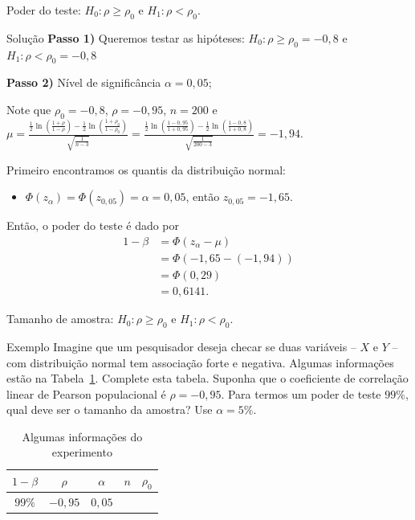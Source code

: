 \documentclass[9pt]{beamer}
\begin{document}
\begin{frame}{Poder do teste: $H_0:\rho \geq \rho_0$ e $H_1: \rho < \rho_0$.}

\begin{block}{Solução}
	\textbf{Passo 1)} Queremos testar as hipóteses: $H_0: \rho \geq \rho_0 = -0,8$ e $H_1:  \rho < \rho_0 = -0,8$
	
	\textbf{Passo 2)} Nível de significância $\alpha = 0,05$;
	
	Note que $\rho_0=-0,8$, $\rho=-0,95$, $n=200$ e $\mu = \frac{\frac{1}{2} \ln \left( \frac{1 + \rho}{1 - \rho} \right) - \frac{1}{2} \ln \left( \frac{1 + \rho_0}{1 - \rho_0} \right)}{\sqrt{\frac{1}{n-3}}}= \allowbreak \frac{\frac{1}{2} \ln \left( \frac{1 - 0,95}{1 + 0,95} \right) - \frac{1}{2} \ln \left( \frac{1 -0,8}{1 + 0,8} \right)}{\sqrt{\frac{1}{200-3}}} = -1,94$.
	
	Primeiro encontramos os quantis da distribuição normal:
	\begin{itemize}
		\item $\Phi\left(z_{\alpha}\right) = \Phi\left(z_{0,05}\right) = \alpha = 0,05$, então $z_{0,05} = -1,65$.
	\end{itemize}

	Então, o poder do teste é dado por
	\begin{align*}
		1 - \beta &= \Phi\left( z_\alpha - \mu \right)\\
		&= \Phi\left( -1,65 - (-1,94) \right)\\
		&= \Phi(0,29)\\
		&= 0,6141.
	\end{align*}
\end{block}

\end{frame}

\begin{frame}{Tamanho de amostra: $H_0:\rho \geq \rho_0$ e $H_1: \rho < \rho_0$.}

\begin{block}{Exemplo}
	Imagine que um pesquisador deseja checar se duas variáveis -- $X$ e $Y$ -- com distribuição normal tem associação forte e negativa. Algumas informações estão na Tabela~\ref{tab:experimento-test-rho-samp-size}. Complete esta tabela. Suponha que o coeficiente de correlação linear de Pearson populacional é $\rho=-0,95$. Para termos um poder de teste $99\%$, qual deve ser o tamanho da amostra? Use $\alpha=5\%$.
	
	\begin{table}[ht]
		\centering
		\begin{tabular}{c|c|c|c|c}
			\toprule[0.05cm]
			$1-\beta$ & $\rho$ & $\alpha$ & $n$ & $\rho_0$ \\
			\midrule
		 $99\%$	& $-0,95$ & $0,05$ &   &   \\ \bottomrule[0.05cm]
		\end{tabular}
		\caption{Algumas informações do experimento} 
		\label{tab:experimento-test-rho-samp-size}
	\end{table}
\end{block}

\end{frame}
\end{document}
